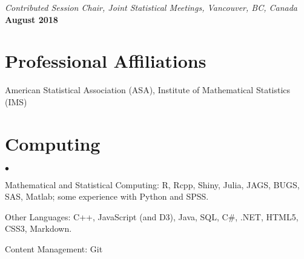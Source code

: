 \documentclass[margin,line]{res}
\newenvironment{list2}{
  \begin{list}{$\bullet$}{%
      \setlength{\itemsep}{0in}
      \setlength{\parsep}{0in} \setlength{\parskip}{0in}
      \setlength{\topsep}{0in} \setlength{\partopsep}{0in}
      \setlength{\leftmargin}{0.2in}}}{\end{list}}
\begin{document}
\begin{resume}
\vspace{-.3cm}
{\em Contributed Session Chair, Joint Statistical Meetings, Vancouver, BC, Canada} \hfill {\bf August 2018}

\section{\sc Professional Affiliations}
American Statistical Association (ASA), Institute of Mathematical Statistics (IMS)

\section{\sc Computing}
\begin{list2}
\item Mathematical and Statistical Computing:  R, Rcpp, Shiny, Julia, JAGS, BUGS, SAS, Matlab; some experience  with Python and SPSS.
\item Other Languages: C++, JavaScript (and D3), Java, SQL, C\#, .NET, HTML5, CSS3, Markdown.
\item Content Management: Git
\end{list2}











\end{resume}
\end{document}
